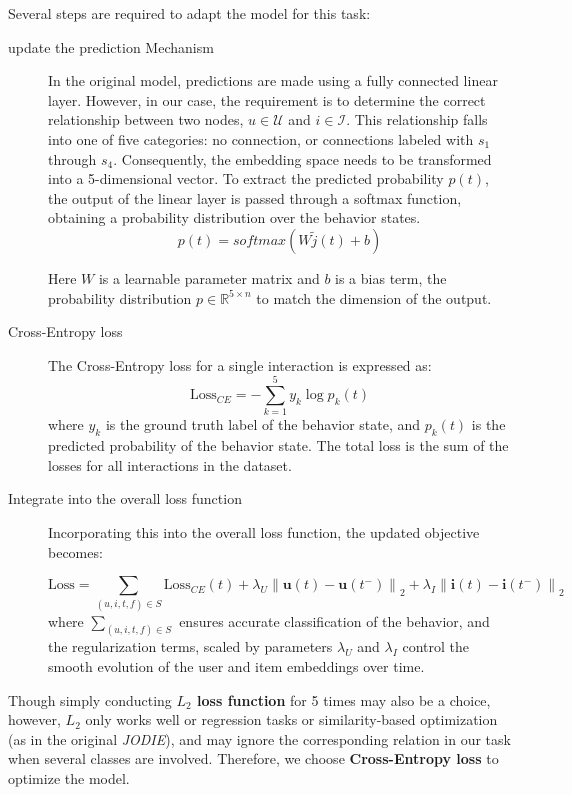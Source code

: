 Several steps are required to adapt the model for this task:
\begin{description}
    \item[update the prediction Mechanism]
    In the original model, predictions are made using a fully connected linear layer. However, in our case, the requirement is to determine the correct relationship between two nodes, $u \in \mathcal{U} $ and $i \in \mathcal{I} $. This relationship falls into one of five categories: no connection, or connections labeled with $s_1$ through $s_4$. Consequently, the embedding space needs to be transformed into a 5-dimensional vector. To extract the predicted probability $p(t)$, the output of the linear layer is passed through a softmax function, obtaining a probability distribution over the behavior states.
    \[ p(t)=softmax(W \tilde{j}(t) + b)\]

    Here $W$ is a learnable parameter matrix and $b$ is a bias term, the probability distribution $p \in \mathbb{R} ^{5 \times n}$ to match the dimension of the output.
    \item[Cross-Entropy loss] 
    
    The Cross-Entropy loss for a single interaction is expressed as:
    \[ \text{Loss}_{CE} = -\sum_{k=1}^{5} y_k \log p_k(t) \]
    where $y_k$ is the ground truth label of the behavior state, and $p_k(t)$ is the predicted probability of the behavior state. The total loss is the sum of the losses for all interactions in the dataset.
    
    
    \item[Integrate into the overall loss function] 
    
    Incorporating this into the overall loss function, the updated objective becomes:

    \begin{equation}
        \text{Loss} = \sum_{(u, i, t, f) \in S} \text{Loss}_{CE}(t)
        + \lambda_U \left\| \mathbf{u}(t) - \mathbf{u}(t^-) \right\|_2 
        + \lambda_I \left\| \mathbf{i}(t) - \mathbf{i}(t^-) \right\|_2
        \end{equation}
    where $\sum_{(u, i, t, f) \in S}$ ensures accurate classification of the behavior, and the regularization terms, scaled by parameters $\lambda_U$ and $\lambda_I$ control the smooth evolution of the user and item embeddings over time.
\end{description}

Though simply conducting \textbf{$L_2$ loss function} for 5 times may also be a choice, however, $L_2$ only works well or regression tasks or similarity-based optimization (as in the original \textit{JODIE}), and may ignore the corresponding relation in our task when several classes are involved. Therefore, we choose \textbf{Cross-Entropy loss} to optimize the model.

